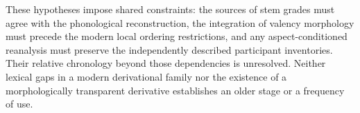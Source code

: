 These hypotheses impose shared constraints: the sources of stem grades must
agree with the phonological reconstruction, the integration of valency
morphology must precede the modern local ordering restrictions, and any
aspect-conditioned reanalysis must preserve the independently described
participant inventories. Their relative chronology beyond those dependencies
is unresolved. Neither lexical gaps in a modern derivational family nor the
existence of a morphologically transparent derivative establishes an older
stage or a frequency of use.
